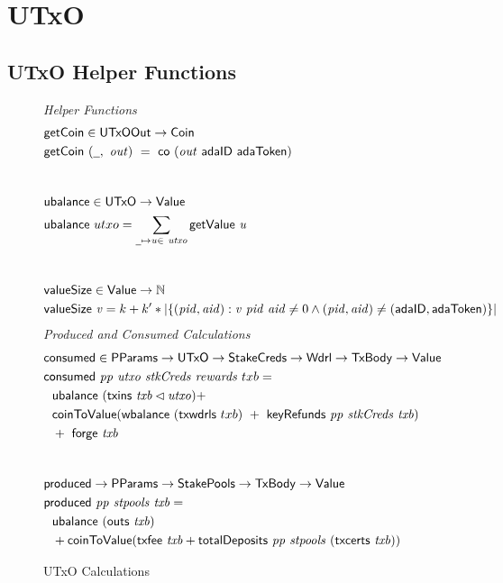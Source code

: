 \section{UTxO}
\label{sec:utxo}

\subsection*{UTxO Helper Functions}

\begin{figure}[htb]
  \emph{Helper Functions}
  \begin{align*}
    & \fun{getCoin} \in \UTxOOut \to \Coin \\
    & \fun{getCoin}~{(\wcard,~\var{out})} ~=~\fun{co}~(\var{out}~\mathsf{adaID}~\mathsf{adaToken}) \\
    \nextdef
    & \fun{ubalance} \in \UTxO \to \Value \\
    & \fun{ubalance} ~ utxo = \sum_{\wcard\mapsto\var{u}\in~\var{utxo}}
    \fun{getValue}~\var{u} \\
    \nextdef
    & \fun{valueSize} \in \Value \to \N \\
    & \fun{valueSize}~\var{v} = k + k' * |\{ (\var{pid}, \var{aid}) : \var{v}~\var{pid}~\var{aid} \neq 0
      \land (\var{pid}, \var{aid}) \neq (\mathsf{adaID}, \mathsf{adaToken}) \}|
  \end{align*}
  \emph{Produced and Consumed Calculations}
  \begin{align*}
    & \fun{consumed} \in \PParams \to \UTxO \to \StakeCreds \to \Wdrl \to \TxBody \to \Value \\
    & \consumed{pp}{utxo}{stkCreds}{rewards}~{txb} = \\
    & ~~\ubalance{(\txins{txb} \restrictdom \var{utxo})} + \\
    &~~  \fun{coinToValue}(\fun{wbalance}~(\fun{txwdrls}~{txb})~+~ \keyRefunds{pp}{stkCreds}{txb}) \\
    &~~+~\fun{forge}~\var{txb} \\
    \nextdef
    & \fun{produced} \to \PParams \to \StakePools \to \TxBody \to \Value \\
    & \fun{produced}~\var{pp}~\var{stpools}~\var{txb} = \\
    &~~\ubalance{(\fun{outs}~{txb})} \\
    &~~+ \fun{coinToValue}(\txfee{txb} + \totalDeposits{pp}{stpools}{(\txcerts{txb})})\\
  \end{align*}
  \caption{UTxO Calculations}
  \label{fig:functions:utxo}
\end{figure}

